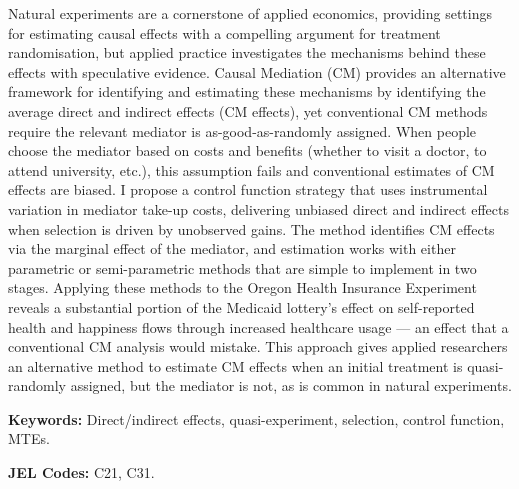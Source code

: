 \noindent
Natural experiments are a cornerstone of applied economics, providing settings for estimating causal effects with a compelling argument for treatment randomisation, but applied practice investigates the mechanisms behind these effects with speculative evidence.
Causal Mediation (CM) provides an alternative framework for identifying and estimating these mechanisms by identifying the average direct and indirect effects (CM effects), yet conventional CM methods require the relevant mediator is as-good-as-randomly assigned.
When people choose the mediator based on costs and benefits (whether to visit a doctor, to attend university, etc.), this assumption fails and conventional estimates of CM effects are biased.
I propose a control function strategy that uses instrumental variation in mediator take-up costs, delivering unbiased direct and indirect effects when selection is driven by unobserved gains.
The method identifies CM effects via the marginal effect of the mediator, and estimation works with either parametric or semi-parametric methods that are simple to implement in two stages.
Applying these methods to the Oregon Health Insurance Experiment reveals a substantial portion of the Medicaid lottery's effect on self-reported health and happiness flows through increased healthcare usage --- an effect that a conventional CM analysis would mistake.
This approach gives applied researchers an alternative method to estimate CM effects when an initial treatment is quasi-randomly assigned, but the mediator is not, as is common in natural experiments.

\vspace{0.5cm}
\noindent
\textbf{Keywords:}
Direct/indirect effects, quasi-experiment, selection, control function, MTEs.

\vspace{0.1cm}
\noindent
\textbf{JEL Codes:}
C21, C31.
